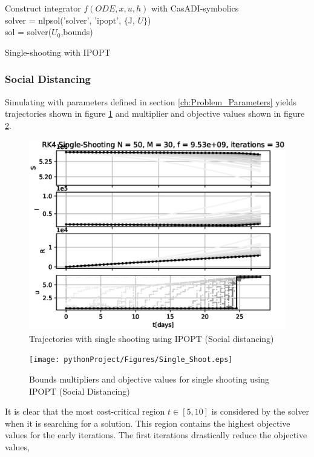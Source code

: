\begin{algorithm}[H]
\SetAlgoLined
{}
Construct integrator $f(ODE, x, u, h)$ with CasADI-symbolics\\
 solver = nlpsol('solver', 'ipopt', $\{$J, $U\}$)\\
 sol = solver($U_0$,bounds)
 \caption{Single-shooting with IPOPT}
 \label{alg:SingleShooting_Integration_IPOPT}
\end{algorithm}
\subsubsection{Social Distancing}
Simulating with parameters defined in section \ref{ch:Problem_Parameters} yields trajectories shown in figure \ref{fig:SH_Traj_IPOPT_SD} and multiplier and objective values shown in figure \ref{fig:SH_con_obj_IPOPT_SD}.

\begin{figure}[H]
    \centering
    \includegraphics[width=.8\textwidth]{pythonProject/Figures/Single_Shooting_Trajectories_IPOPT_Social_Distancing.eps}
    \caption{Trajectories with single shooting using IPOPT (Social distancing)}
    \label{fig:SH_Traj_IPOPT_SD}
\end{figure}

\begin{figure}[H]
    \centering
    \texttt{[image: pythonProject/Figures/Single\_Shoot.eps]}
    \caption{Bounds multipliers and objective values for single shooting using IPOPT (Social Distancing)}
    \label{fig:SH_con_obj_IPOPT_SD}
\end{figure}
It is clear that the most cost-critical region $t\in [5, 10]$ is considered by the solver when it is searching for a solution. This region contains the highest objective values for the early iterations. The first iterations drastically reduce the objective values, 

